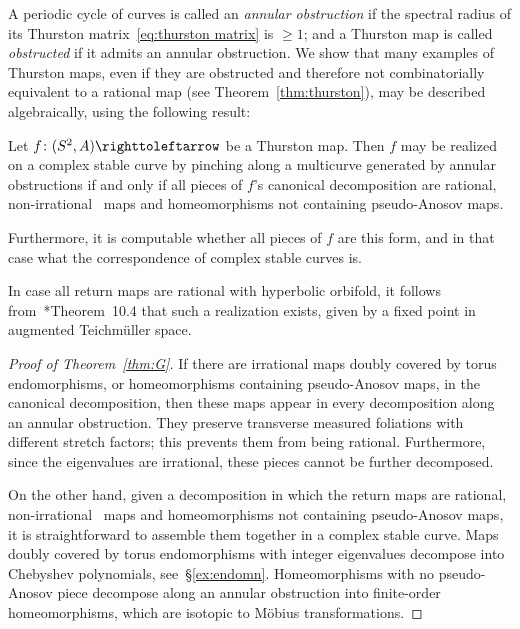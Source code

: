 \documentclass{amsart}
\begin{document}
A periodic cycle of curves is called an \emph{annular obstruction} if
the spectral radius of its Thurston matrix~\eqref{eq:thurston matrix}
is $\ge1$; and a Thurston map is called \emph{obstructed} if it admits
an annular obstruction.  We show that many examples of Thurston maps,
even if they are obstructed and therefore not combinatorially
equivalent to a rational map (see Theorem~\ref{thm:thurston}), may be
described algebraically, using the following result:
\begin{mainthm}\label{thm:G}
  Let $f\colon(S^2,A)\selfmap$ be a Thurston map. Then $f$ may be
  realized on a complex stable curve by pinching along a multicurve
  generated by annular obstructions if and only if all pieces of
  $f$'s canonical decomposition are rational, non-irrational \Tor\
  maps and homeomorphisms not containing pseudo-Anosov maps.

  Furthermore, it is computable whether all pieces of $f$ are this
  form, and in that case what the correspondence of complex stable
  curves is.
\end{mainthm}
In case all return maps are rational with hyperbolic orbifold, it
follows from~\cite{selinger:augts}*{Theorem~10.4} that such a
realization exists, given by a fixed point in augmented Teichm\"uller
space.

\begin{proof}[Proof of Theorem~\ref{thm:G}]
  If there are irrational maps doubly covered by torus endomorphisms,
  or homeomorphisms containing pseudo-Anosov maps, in the canonical
  decomposition, then these maps appear in every decomposition along
  an annular obstruction. They preserve transverse measured foliations
  with different stretch factors; this prevents them from being
  rational. Furthermore, since the eigenvalues are irrational, these
  pieces cannot be further decomposed.

  On the other hand, given a decomposition in which the return maps
  are rational, non-irrational \Tor\ maps and homeomorphisms not
  containing pseudo-Anosov maps, it is straightforward to assemble
  them together in a complex stable curve. Maps doubly covered by
  torus endomorphisms with integer eigenvalues decompose into
  Chebyshev polynomials, see~\S\ref{ex:endomn}. Homeomorphisms with no
  pseudo-Anosov piece decompose along an annular obstruction into
  finite-order homeomorphisms, which are isotopic to M\"obius
  transformations.
\end{proof}
\end{document}

